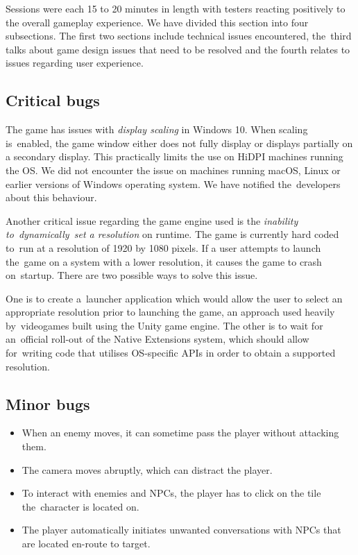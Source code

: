 \documentclass[thesis=B,english,hidelinks]{FITthesisXE}[2012/06/26]
\begin{document}
Sessions were each 15 to 20 minutes in length with testers reacting positively to the overall gameplay experience. We have divided this section into four subsections. The first two sections include technical issues encountered, the~third talks about game design issues that need to be resolved and the fourth relates to issues regarding user experience.

\subsection{Critical bugs}

The game has issues with \emph{display scaling} in Windows 10. When scaling is~enabled, the game window either does not fully display or displays partially on a secondary display. This practically limits the use on HiDPI machines running the OS. We did not encounter the issue on machines running macOS, Linux or earlier versions of Windows operating system. We have notified the~developers about this behaviour.

Another critical issue regarding the game engine used is the \emph{inability to~dynamically~set a resolution} on runtime. The game is currently hard coded to~run at a resolution of 1920 by 1080 pixels. If a user attempts to launch the~game on a system with a lower resolution, it causes the game to crash on~startup. There are two possible ways to solve this issue. 

One is to create a~launcher application which would allow the user to select an appropriate resolution prior to launching the game, an approach used heavily by~videogames built using the Unity game engine. The other is to wait for an~official roll-out of the Native Extensions system, which should allow for~writing code that utilises OS-specific APIs in order to obtain a supported resolution.

\subsection{Minor bugs}

\begin{itemize}
\item When an enemy moves, it can sometime pass the player without attacking them.
\item The camera moves abruptly, which can distract the player.
\item To interact with enemies and NPCs, the player has to click on the tile the~character is located on.
\item The player automatically initiates unwanted conversations with NPCs that are located en-route to target.
\end{itemize}
\end{document}
